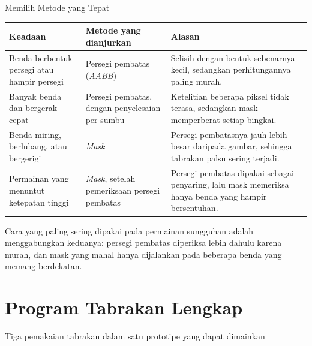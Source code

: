 \documentclass[aspectratio=169,10pt]{beamer}
\begin{document}
\begin{frame}{Memilih Metode yang Tepat}
{\scriptsize
\renewcommand{\arraystretch}{1.14}
\begin{tabularx}{\textwidth}{@{}>{\raggedright\arraybackslash}p{4.5cm}
    >{\raggedright\arraybackslash}p{3.3cm}
    >{\raggedright\arraybackslash}X@{}}
\toprule
\textbf{Keadaan} & \textbf{Metode yang dianjurkan} & \textbf{Alasan} \\
\midrule
Benda berbentuk persegi atau hampir persegi &
  Persegi pembatas (\emph{AABB}) &
  Selisih dengan bentuk sebenarnya kecil, sedangkan perhitungannya paling
  murah. \\
Banyak benda dan bergerak cepat &
  Persegi pembatas, dengan penyelesaian per sumbu &
  Ketelitian beberapa piksel tidak terasa, sedangkan mask memperberat setiap
  bingkai. \\
Benda miring, berlubang, atau bergerigi &
  \emph{Mask} &
  Persegi pembatasnya jauh lebih besar daripada gambar, sehingga tabrakan
  palsu sering terjadi. \\
Permainan yang menuntut ketepatan tinggi &
  \emph{Mask}, setelah pemeriksaan persegi pembatas &
  Persegi pembatas dipakai sebagai penyaring, lalu mask memeriksa hanya benda
  yang hampir bersentuhan. \\
\bottomrule
\end{tabularx}}
\vspace{-1.5cm}
\begin{kotak}
Cara yang paling sering dipakai pada permainan sungguhan adalah menggabungkan
keduanya: persegi pembatas diperiksa lebih dahulu karena murah, dan mask yang
mahal hanya dijalankan pada beberapa benda yang memang berdekatan.
\end{kotak}
\end{frame}

\section{Program Tabrakan Lengkap}
  {Tiga pemakaian tabrakan dalam satu prototipe yang dapat dimainkan}
\end{document}
